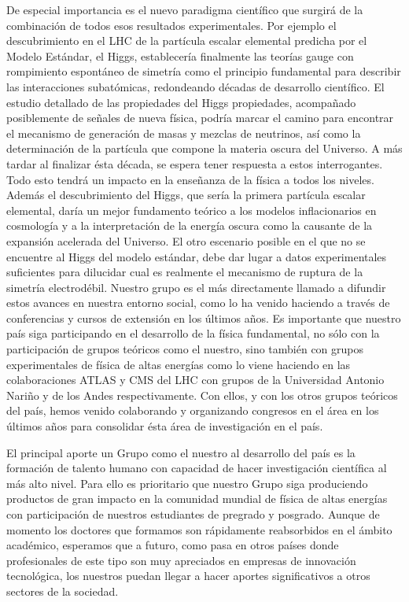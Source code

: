 De especial importancia es el nuevo paradigma científico que surgirá
de la combinación de todos esos resultados experimentales. Por ejemplo
el descubrimiento en el LHC de la partícula escalar elemental predicha
por el Modelo Estándar, el Higgs, establecería finalmente las teorías
gauge con rompimiento espontáneo de simetría como el principio
fundamental para describir las interacciones subatómicas, redondeando
décadas de desarrollo científico.  El estudio detallado de las
propiedades del Higgs propiedades, acompañado posiblemente de señales
de nueva física, podría marcar el camino para encontrar el mecanismo
de generación de masas y mezclas de neutrinos, así como la
determinación de la partícula que compone la materia oscura del
Universo. A más tardar al finalizar ésta década, se espera tener
respuesta a estos interrogantes. Todo esto tendrá un impacto en la
enseñanza de la física a todos los niveles. Además el descubrimiento
del Higgs, que sería la primera partícula escalar elemental, daría un
mejor fundamento teórico a los modelos inflacionarios en cosmología y
a la interpretación de la energía oscura como la causante de la
expansión acelerada del Universo. El otro escenario posible en el que
no se encuentre al Higgs del modelo estándar, debe dar lugar a datos
experimentales suficientes para dilucidar cual es realmente el
mecanismo de ruptura de la simetría electrodébil. Nuestro grupo es el
más directamente llamado a difundir estos avances en nuestra entorno social,
como lo ha venido haciendo a través de conferencias y cursos de
extensión en los últimos años. Es importante que nuestro país siga
participando en el desarrollo de la física fundamental, no sólo con la
participación de grupos teóricos como el nuestro, sino también con
grupos experimentales de física de altas energías como lo viene
haciendo en las colaboraciones ATLAS y CMS del LHC con grupos de la
Universidad Antonio Nariño y de los Andes respectivamente. Con ellos,
y con los otros grupos teóricos del país, hemos venido colaborando y
organizando congresos en el área en los últimos años para consolidar
ésta área de investigación en el país.

El principal aporte un Grupo como el nuestro al desarrollo del país es
la formación de talento humano con capacidad de hacer investigación
científica al más alto nivel. Para ello es prioritario que nuestro
Grupo siga produciendo productos de gran impacto en la comunidad
mundial de física de altas energías con participación de nuestros
estudiantes de pregrado y posgrado.  Aunque de momento los doctores
que formamos son rápidamente reabsorbidos en el ámbito académico, 
esperamos que a futuro, como pasa en otros países donde profesionales
de este tipo son muy apreciados en empresas de innovación tecnológica,
los nuestros puedan llegar a hacer aportes significativos a otros
sectores de la sociedad.


